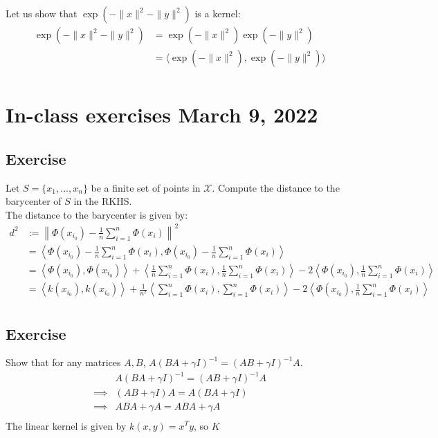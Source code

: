 \documentclass{article}
\newcommand{\1}{\mathbf{1}}
\begin{document}
Let us show that \(\exp\left(- \|x\|^2 - \|y\|^2\right)\) is a kernel:
\begin{align*}
  \exp\left(- \|x\|^2 - \|y\|^2\right)
   & = \exp\left(- \|x\|^2 \right) \exp \left(- \|y\|^2\right)                  \\
   & = \langle \exp\left(- \|x\|^2 \right), \exp \left(- \|y\|^2\right) \rangle \\
\end{align*}

\section{In-class exercises March 9, 2022}
\subsection{Exercise}
Let \(S = \{ x_1, \ldots, x_n\}\) be a finite set of points in \(\mathcal{X}\). Compute the distance to the barycenter of \(S\) in the RKHS. \\
The distance to the barycenter is given by:
\begin{align*}
  d^2
   & := \left\| \Phi(x_{i_0}) - \frac{1}{n} \sum_{i=1}^n \Phi(x_i) \right\|^2                                                                                                                                                                       \\
   & = \left\langle \Phi(x_{i_0}) - \frac{1}{n} \sum_{i=1}^n \Phi(x_i), \Phi(x_{i_0}) - \frac{1}{n} \sum_{i=1}^n \Phi(x_i) \right\rangle                                                                                                            \\
   & = \left\langle \Phi(x_{i_0}), \Phi(x_{i_0}) \right\rangle + \left\langle \frac{1}{n} \sum_{i=1}^n \Phi(x_i), \frac{1}{n} \sum_{i=1}^n \Phi(x_i) \right\rangle - 2 \left\langle \Phi(x_{i_0}), \frac{1}{n} \sum_{i=1}^n \Phi(x_i) \right\rangle \\
   & = \left\langle k(x_{i_0}), k(x_{i_0}) \right\rangle + \frac{1}{n^2} \left\langle \sum_{i=1}^n \Phi(x_i), \sum_{i=1}^n \Phi(x_i) \right\rangle - 2 \left\langle \Phi(x_{i_0}), \frac{1}{n} \sum_{i=1}^n \Phi(x_i) \right\rangle                 \\
\end{align*}

\subsection{Exercise}
Show that for any matrices \(A, B\), \(A\left(BA + \gamma I\right)^{-1} = \left(AB + \gamma I\right)^{-1} A\).
\begin{align*}
           &
  A\left(BA + \gamma I\right)^{-1} = \left(AB + \gamma I\right)^{-1} A \\
  \implies &
  \left(AB + \gamma I\right) A = A \left(BA + \gamma I\right)          \\
  \implies &
  ABA + \gamma A = ABA + \gamma A                                      \\
\end{align*}
The linear kernel is given by \(k(x, y) = x^T y\), so \(K\)
\end{document}

